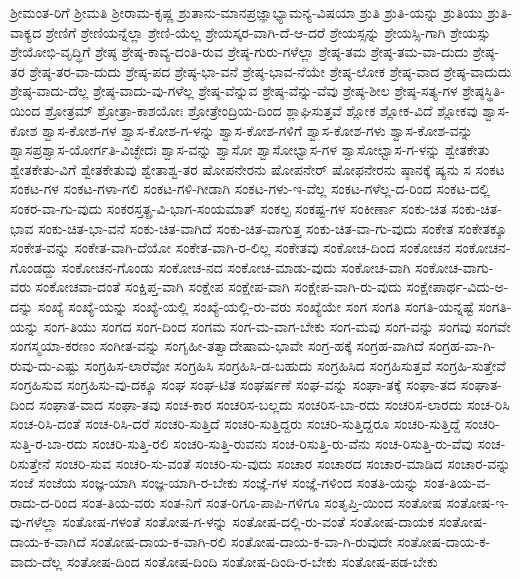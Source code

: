 {ಶ್ರೀಮಂತ-ರಿಗೆ
ಶ್ರೀಮತಿ
ಶ್ರೀರಾಮ-ಕೃಷ್ಣ
ಶ್ರುತಾನು-ಮಾನಪ್ರಜ್ಞಾಭ್ಯಾಮನ್ಯ-ವಿಷಯಾ
ಶ್ರುತಿ
ಶ್ರುತಿ-ಯನ್ನು
ಶ್ರುತಿಯು
ಶ್ರುತಿ-ವಾಕ್ಯದ
ಶ್ರೇಣಿಗೆ
ಶ್ರೇಣಿಯನ್ನೆಲ್ಲಾ
ಶ್ರೇಣಿ-ಯೆಲ್ಲ
ಶ್ರೇಯಸ್ಕರ-ವಾಗಿ-ದೆ-ಆ-ದರೆ
ಶ್ರೇಯಸ್ಸನ್ನು
ಶ್ರೇಯಸ್ಸಿ-ಗಾಗಿ
ಶ್ರೇಯಸ್ಸು
ಶ್ರೇಯೋಭಿ-ವೃದ್ಧಿಗೆ
ಶ್ರೇಷ್ಠ
ಶ್ರೇಷ್ಠ-ಕಾವ್ಯ-ದಂತಿ-ರುವ
ಶ್ರೇಷ್ಠ-ಗುರು-ಗಳೆಲ್ಲಾ
ಶ್ರೇಷ್ಠ-ತಮ
ಶ್ರೇಷ್ಠ-ತಮ-ವಾ-ದುದು
ಶ್ರೇಷ್ಠ-ತರ
ಶ್ರೇಷ್ಠ-ತರ-ವಾ-ದುದು
ಶ್ರೇಷ್ಠ-ಪದ
ಶ್ರೇಷ್ಠ-ಭಾ-ವನೆ
ಶ್ರೇಷ್ಠ-ಭಾವ-ನೆಯೇ
ಶ್ರೇಷ್ಠ-ಲೋಕ
ಶ್ರೇಷ್ಠ-ವಾದ
ಶ್ರೇಷ್ಠ-ವಾದುದು
ಶ್ರೇಷ್ಠ-ವಾದು-ದೆಲ್ಲ
ಶ್ರೇಷ್ಠ-ವಾದು-ವು-ಗಳೆಲ್ಲ
ಶ್ರೇಷ್ಠ-ವೆನ್ನುವ
ಶ್ರೇಷ್ಠ-ವೆನ್ನು-ವೆವು
ಶ್ರೇಷ್ಠ-ಶೀಲ
ಶ್ರೇಷ್ಠ-ಸತ್ಯ-ಗಳ
ಶ್ರೇಷ್ಠಸ್ಥಿತಿ-ಯಿಂದ
ಶ್ರೋತ್ರಮ್
ಶ್ರೋತ್ರಾ-ಕಾಶಯೋಃ
ಶ್ರೋತ್ರೇಂದ್ರಿಯ-ದಿಂದ
ಶ್ಲಾಘಿಸುತ್ತವೆ
ಶ್ಲೋಕ
ಶ್ಲೋಕ-ವಿದೆ
ಶ್ಲೋಕವು
ಶ್ವಾಸ-ಕೋಶ
ಶ್ವಾಸ-ಕೋಶ-ಗಳ
ಶ್ವಾಸ-ಕೋಶ-ಗ-ಳನ್ನು
ಶ್ವಾಸ-ಕೋಶ-ಗಳಿಗೆ
ಶ್ವಾಸ-ಕೋಶ-ಗಳು
ಶ್ವಾಸ-ಕೋಶ-ವನ್ನು
ಶ್ವಾಸಪ್ರಶ್ವಾಸ-ಯೋರ್ಗತಿ-ವಿಚ್ಛೇದಃ
ಶ್ವಾಸ-ವನ್ನು
ಶ್ವಾಸೋ
ಶ್ವಾಸೋಛ್ವಾಸ-ಗಳ
ಶ್ವಾಸೋಛ್ವಾಸ-ಗ-ಳನ್ನು
ಶ್ವೇತಕೇತು
ಶ್ವೇತಕೇತು-ವಿಗೆ
ಶ್ವೇತಕೇತುವು
ಶ್ವೇತಾಶ್ವ-ತರ
ಷೋಪನೇರನು
ಷೋಪನೇರ್
ಷೋಫನೇರನು
ಷ್ಠಾನಕ್ಕೆ
ಷ್ಯನು
ಸ
ಸಂಕಟ
ಸಂಕಟ-ಗಳ
ಸಂಕಟ-ಗಳಾ-ಗಲಿ
ಸಂಕಟ-ಗಳಿ-ಗೀಡಾಗಿ
ಸಂಕಟ-ಗಳು-ಇ-ವೆಲ್ಲ
ಸಂಕಟ-ಗಳೆಲ್ಲ-ದ-ರಿಂದ
ಸಂಕಟ-ದಲ್ಲಿ
ಸಂಕರ-ವಾ-ಗು-ವುದು
ಸಂಕರಸ್ತತ್ಪ್ರ-ವಿ-ಭಾಗ-ಸಂಯಮಾತ್
ಸಂಕಲ್ಪ
ಸಂಕಷ್ಟ-ಗಳ
ಸಂಕೀರ್ಣಾ
ಸಂಕು-ಚಿತ
ಸಂಕು-ಚಿತ-ಭಾವ
ಸಂಕು-ಚಿತ-ಭಾ-ವನೆ
ಸಂಕು-ಚಿತ-ವಾಗಿದೆ
ಸಂಕು-ಚಿತ-ವಾಗುತ್ತ
ಸಂಕು-ಚಿತ-ವಾ-ಗು-ವುದು
ಸಂಕೇತ
ಸಂಕೇತಕ್ಕೂ
ಸಂಕೇತ-ವನ್ನು
ಸಂಕೇತ-ವಾಗಿ-ದೆಯೋ
ಸಂಕೇತ-ವಾಗಿ-ರ-ಲಿಲ್ಲ
ಸಂಕೇತವು
ಸಂಕೋಚ-ದಿಂದ
ಸಂಕೋಚನ
ಸಂಕೋಚನ-ಗೊಂಡದ್ದು
ಸಂಕೋಚನ-ಗೊಂಡು
ಸಂಕೋಚ-ನದ
ಸಂಕೋಚ-ಮಾಡು-ವುದು
ಸಂಕೋಚ-ವಾಗಿ
ಸಂಕೋಚ-ವಾಗು-ವರು
ಸಂಕೋಚವಾ-ದಂತೆ
ಸಂಕ್ಷಿಪ್ತ-ವಾಗಿ
ಸಂಕ್ಷೇಪ
ಸಂಕ್ಷೇಪ-ವಾಗಿ
ಸಂಕ್ಷೇಪ-ವಾಗಿ-ರು-ವುದು
ಸಂಕ್ಷೇಪಾರ್ಥ-ವಿದು-ಅ-ದನ್ನು
ಸಂಖ್ಯೆ
ಸಂಖ್ಯೆ-ಯನ್ನು
ಸಂಖ್ಯೆ-ಯಲ್ಲಿ
ಸಂಖ್ಯೆ-ಯಲ್ಲಿ-ರು-ವರು
ಸಂಖ್ಯೆಯೇ
ಸಂಗ
ಸಂಗತಿ
ಸಂಗತಿ-ಯನ್ನಷ್ಟೆ
ಸಂಗತಿ-ಯನ್ನು
ಸಂಗ-ತಿಯು
ಸಂಗದ
ಸಂಗ-ದಿಂದ
ಸಂಗಮ
ಸಂಗ-ಮ-ವಾಗ-ಬೇಕು
ಸಂಗ-ಮವು
ಸಂಗ-ವನ್ನು
ಸಂಗವು
ಸಂಗವೇ
ಸಂಗಸ್ಮಯಾ-ಕರಣಂ
ಸಂಗೀತ-ವನ್ನು
ಸಂಗೃಹೀ-ತತ್ವಾದೇಷಾಮ-ಭಾವೇ
ಸಂಗ್ರ-ಹಕ್ಕೆ
ಸಂಗ್ರಹ-ವಾಗಿದೆ
ಸಂಗ್ರಹ-ವಾ-ಗಿ-ರುವು-ದು-ಎಷ್ಟು
ಸಂಗ್ರಹಿಸ-ಲಾರೆವೋ
ಸಂಗ್ರಹಿಸಿ
ಸಂಗ್ರಹಿಸಿ-ಡ-ಬಹುದು
ಸಂಗ್ರಹಿಸಿದ
ಸಂಗ್ರಹಿಸುತ್ತವೆ
ಸಂಗ್ರಹಿ-ಸುತ್ತೇವೆ
ಸಂಗ್ರಹಿಸುವ
ಸಂಗ್ರಹಿಸು-ವು-ದಕ್ಕೂ
ಸಂಘ
ಸಂಘ-ಟಿತ
ಸಂಘರ್ಷಣೆ
ಸಂಘ-ವನ್ನು
ಸಂಘಾ-ತಕ್ಕೆ
ಸಂಘಾ-ತದ
ಸಂಘಾತ-ದಿಂದ
ಸಂಘಾತ-ವಾದ
ಸಂಘಾ-ತವು
ಸಂಚ-ಕಾರ
ಸಂಚರಿಸ-ಬಲ್ಲದು
ಸಂಚರಿಸ-ಬಾ-ರದು
ಸಂಚರಿಸ-ಲಾರದು
ಸಂಚ-ರಿಸಿ
ಸಂಚ-ರಿಸಿ-ದಂತೆ
ಸಂಚ-ರಿಸಿ-ದರೆ
ಸಂಚರಿ-ಸುತ್ತಿದೆ
ಸಂಚರಿ-ಸುತ್ತಿದ್ದರು
ಸಂಚರಿ-ಸುತ್ತಿದ್ದರೂ
ಸಂಚರಿ-ಸುತ್ತಿದ್ದೆ
ಸಂಚರಿ-ಸುತ್ತಿ-ರ-ಬಾ-ರದು
ಸಂಚರಿ-ಸುತ್ತಿ-ರಲಿ
ಸಂಚರಿ-ಸುತ್ತಿ-ರುವನು
ಸಂಚ-ರಿಸುತ್ತಿ-ರು-ವೆನು
ಸಂಚ-ರಿಸುತ್ತಿ-ರು-ವೆವು
ಸಂಚ-ರಿಸುತ್ತೇನೆ
ಸಂಚರಿ-ಸುವ
ಸಂಚರಿ-ಸು-ವಂತೆ
ಸಂಚರಿ-ಸು-ವುದು
ಸಂಚಾರ
ಸಂಚಾರದ
ಸಂಚಾರ-ಮಾಡಿದ
ಸಂಚಾರ-ವನ್ನು
ಸಂಜೆ
ಸಂಜೆಯ
ಸಂಜ್ಞ-ಯಾಗಿ
ಸಂಜ್ಞ-ಯಾಗಿ-ರ-ಬೇಕು
ಸಂಜ್ಞೆ-ಗಳ
ಸಂಜ್ಞೆ-ಗಳಿಂದ
ಸಂತತಿ-ಯನ್ನು
ಸಂತ-ತಿಯ-ವ-ರಾದು-ದ-ರಿಂದ
ಸಂತ-ತಿಯ-ವರು
ಸಂತ-ನಿಗೆ
ಸಂತ-ರಿಗೂ-ಪಾಪಿ-ಗಳಿಗೂ
ಸಂತೃಪ್ತಿ-ಯಿಂದ
ಸಂತೋಷ
ಸಂತೋಷ-ಇ-ವು-ಗಳೆಲ್ಲಾ
ಸಂತೋಷ-ಗಳಂತೆ
ಸಂತೋಷ-ಗ-ಳನ್ನು
ಸಂತೋಷ-ದಲ್ಲಿ-ರು-ವಂತೆ
ಸಂತೋಷ-ದಾಯಕ
ಸಂತೋಷ-ದಾಯ-ಕ-ವಾಗಿದೆ
ಸಂತೋಷ-ದಾಯ-ಕ-ವಾಗಿ-ರಲಿ
ಸಂತೋಷ-ದಾಯ-ಕ-ವಾ-ಗಿ-ರುವುದೇ
ಸಂತೋಷ-ದಾಯ-ಕ-ವಾದು-ದೆಲ್ಲ
ಸಂತೋಷ-ದಿಂದ
ಸಂತೋಷ-ದಿಂದಿ
ಸಂತೋಷ-ದಿಂದಿ-ರ-ಬೇಕು
ಸಂತೋಷ-ಪಡ-ಬೇಕು
}
